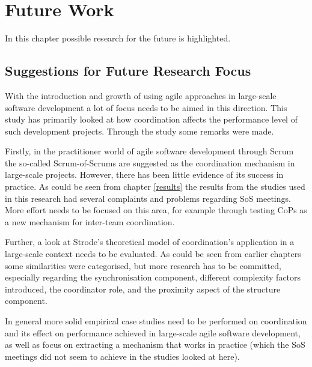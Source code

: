 \chapter{Future Work}


\minitoc

In this chapter possible research for the future is highlighted.
\newpage

\section{Suggestions for Future Research Focus}

With the introduction and growth of using agile approaches in large-scale software development a lot of focus needs to be aimed in this direction. This study has primarily looked at how coordination affects the performance level of such development projects. Through the study some remarks were made.

Firstly, in the practitioner world of agile software development through Scrum the so-called Scrum-of-Scrums are suggested as the coordination mechanism in large-scale projects. However, there has been little evidence of its success in practice. As could be seen from chapter \ref{results} the results from the studies used in this research had several complaints and problems regarding SoS meetings. More effort needs to be focused on this area, for example through testing CoPs as a new mechanism for inter-team coordination.

Further, a look at Strode's theoretical model of coordination's application in a large-scale context needs to be evaluated. As could be seen from earlier chapters some similarities were categorised, but more research has to be committed, especially regarding the synchronisation component, different complexity factors introduced, the coordinator role, and the proximity aspect of the structure component.

In general more solid empirical case studies need to be performed on coordination and its effect on performance achieved in large-scale agile software development, as well as focus on extracting a mechanism that works in practice (which the SoS meetings did not seem to achieve in the studies looked at here).

\newpage